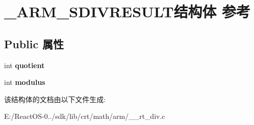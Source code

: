 \hypertarget{struct___a_r_m___s_d_i_v_r_e_s_u_l_t}{}\section{\+\_\+\+A\+R\+M\+\_\+\+S\+D\+I\+V\+R\+E\+S\+U\+L\+T结构体 参考}
\label{struct___a_r_m___s_d_i_v_r_e_s_u_l_t}
\subsection*{Public 属性}
\begin{DoxyCompactItemize}
\item 
\mbox{\label{struct___a_r_m___s_d_i_v_r_e_s_u_l_t_aad17b25ecf3dfa8400965eaf33b110bc}} 
int {\bfseries quotient}
\item 
\mbox{\label{struct___a_r_m___s_d_i_v_r_e_s_u_l_t_a9e0cc082e427edd061862401e8e23f96}} 
int {\bfseries modulus}
\end{DoxyCompactItemize}


该结构体的文档由以下文件生成\+:\begin{DoxyCompactItemize}
\item 
E\+:/\+React\+O\+S-\/0../sdk/lib/crt/math/arm/\+\_\+\+\_\+rt\+\_\+div.\+c\end{DoxyCompactItemize}
